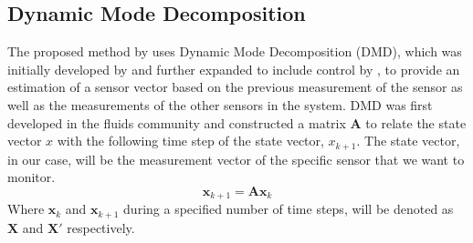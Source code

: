 %
%
%

\subsection{Dynamic Mode Decomposition}
The proposed method by \cite{DeSilva2020} uses Dynamic Mode Decomposition (DMD), which was initially developed by \cite{schmid2011applications} and further expanded to include control by \cite{proctor2016dynamic}, to provide an estimation of a sensor vector based on the previous measurement of the sensor as well as the measurements of the other sensors in the system. DMD was first developed in the fluids community and constructed a matrix $\mathbf{A}$ to relate the state vector $x$ with the following time step of the state vector, $x_{k+1}$. The state vector, in our case, will be the measurement vector of the specific sensor that we want to monitor.
\begin{equation}
	\mathbf{x}_{k+1} = \mathbf{Ax}_k
\end{equation}
Where $\mathbf{x}_k$ and $\mathbf{x}_{k+1}$ during a specified number of time steps, will be denoted as $\mathbf{X}$ and $\mathbf{X'}$ respectively.

